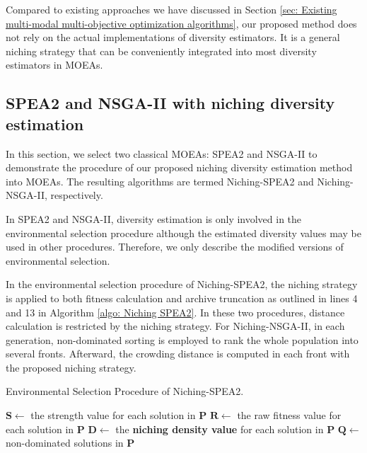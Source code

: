 Compared to existing approaches we have discussed in Section \ref{sec: Existing multi-modal multi-objective optimization algorithms}, our proposed method does not rely on the actual implementations of diversity estimators. It is a general niching strategy that can be conveniently integrated into most diversity estimators in MOEAs.


\subsection{SPEA2 and NSGA-II with niching diversity estimation}
In this section, we select two classical MOEAs: SPEA2 and NSGA-II to demonstrate the procedure of our proposed niching diversity estimation method into MOEAs. The resulting algorithms are termed Niching-SPEA2 and Niching-NSGA-II, respectively.

In SPEA2 and NSGA-II, diversity estimation is only involved in the environmental selection procedure although the estimated diversity values may be used in other procedures. Therefore, we only describe the modified versions of environmental selection.

In the environmental selection procedure of Niching-SPEA2, the niching strategy is applied to both fitness calculation and archive truncation as outlined in lines 4 and 13 in Algorithm \ref{algo: Niching SPEA2}. In these two procedures, distance calculation is restricted by the niching strategy. For Niching-NSGA-II, in each generation, non-dominated sorting is employed to rank the whole population into several fronts. Afterward, the crowding distance is computed in each front with the proposed niching strategy.

\begin{algorithm}
	\caption{Environmental Selection Procedure of Niching-SPEA2.}
	\label{algo: Niching SPEA2}
	$\boldsymbol{S} \gets$ the strength value for each solution in $\boldsymbol{P}$\;
	$\boldsymbol{R} \gets$ the raw fitness value for each solution in $\boldsymbol{P}$\;
	$\boldsymbol{D} \gets$ the \textbf{niching density value} for each solution in $\boldsymbol{P}$\;
	$\boldsymbol{Q} \gets $ non-dominated solutions in $\boldsymbol{P}$\;
\end{algorithm}




